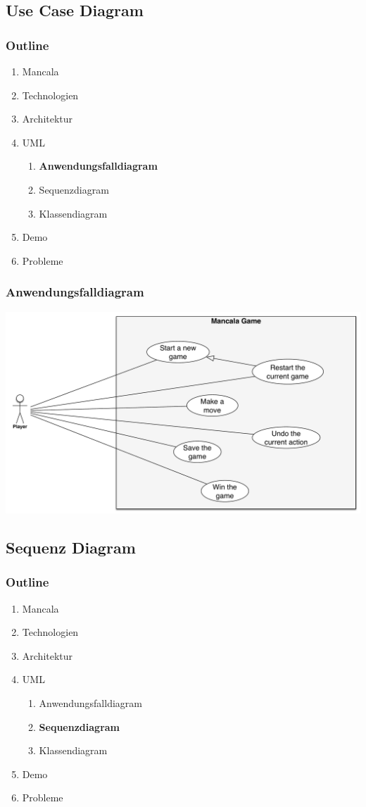 \documentclass[
	10pt,
	t		%
]{beamer}
\begin{document}
\subsection{Use Case Diagram}
\begin{frame}
\frametitle{Outline}
\begin{enumerate}
\item Mancala
\item Technologien
\item Architektur
\item UML
\begin{enumerate}
\item \textbf{Anwendungsfalldiagram}
\item Sequenzdiagram
\item Klassendiagram
\end{enumerate}
\item Demo
\item Probleme
\end{enumerate}
\end{frame}

\begin{frame}
\frametitle{Anwendungsfalldiagram}
\begin{center}
\includegraphics[scale=0.32]{./../Diagrams/UseCaseDiagram.pdf}
\end{center}
\end{frame}

\subsection{Sequenz Diagram}
\begin{frame}
\frametitle{Outline}
\begin{enumerate}
\item Mancala
\item Technologien
\item Architektur
\item UML
\begin{enumerate}
\item Anwendungsfalldiagram
\item \textbf{Sequenzdiagram}
\item Klassendiagram
\end{enumerate}
\item Demo
\item Probleme
\end{enumerate}
\end{frame}
\end{document}

